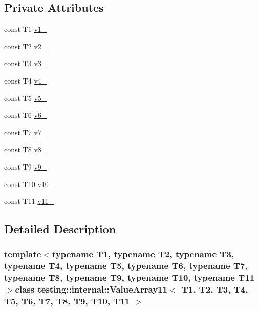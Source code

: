 \subsection*{\-Private \-Attributes}
\begin{DoxyCompactItemize}
\item 
const \-T1 \hyperlink{classtesting_1_1internal_1_1ValueArray11_aac1d0654cc6c1aceb4a5d0fa7a98042e}{v1\-\_\-}
\item 
const \-T2 \hyperlink{classtesting_1_1internal_1_1ValueArray11_a9f0a8ce6ce2fd27e980c4c51a7a7256a}{v2\-\_\-}
\item 
const \-T3 \hyperlink{classtesting_1_1internal_1_1ValueArray11_a4f8257321a2eab0456239174d6712d5e}{v3\-\_\-}
\item 
const \-T4 \hyperlink{classtesting_1_1internal_1_1ValueArray11_aac184059fee257381ccae81d8d112f85}{v4\-\_\-}
\item 
const \-T5 \hyperlink{classtesting_1_1internal_1_1ValueArray11_a1f3e0ada8419ed2e17cc61e6c0c54404}{v5\-\_\-}
\item 
const \-T6 \hyperlink{classtesting_1_1internal_1_1ValueArray11_a13d84d5824617bbc6fb1a6b3ee3cb745}{v6\-\_\-}
\item 
const \-T7 \hyperlink{classtesting_1_1internal_1_1ValueArray11_a4063f0b7a528133d018ee488ba44a9a3}{v7\-\_\-}
\item 
const \-T8 \hyperlink{classtesting_1_1internal_1_1ValueArray11_a596bc5260b2474271d1f6910ff6f665d}{v8\-\_\-}
\item 
const \-T9 \hyperlink{classtesting_1_1internal_1_1ValueArray11_a6356e16cf54a9dfac8525f20242af31e}{v9\-\_\-}
\item 
const \-T10 \hyperlink{classtesting_1_1internal_1_1ValueArray11_a147ca4457ea439b00a93087231ff77ef}{v10\-\_\-}
\item 
const \-T11 \hyperlink{classtesting_1_1internal_1_1ValueArray11_a12a4baf9ab57c7e9b5b4f1612e59e529}{v11\-\_\-}
\end{DoxyCompactItemize}


\subsection{\-Detailed \-Description}
\subsubsection*{template$<$typename T1, typename T2, typename T3, typename T4, typename T5, typename T6, typename T7, typename T8, typename T9, typename T10, typename T11$>$class testing\-::internal\-::\-Value\-Array11$<$ T1, T2, T3, T4, T5, T6, T7, T8, T9, T10, T11 $>$}



